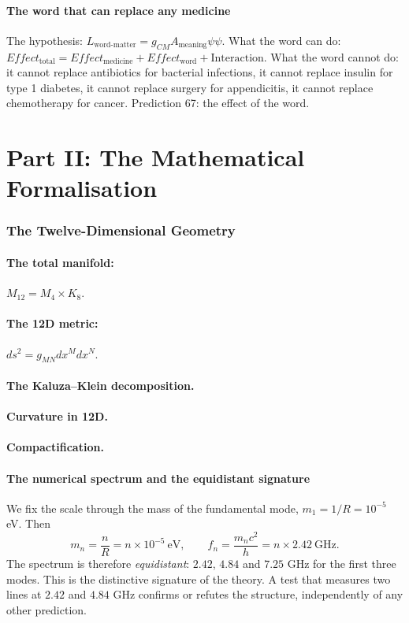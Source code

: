 \documentclass[11pt,a4paper]{article}
\begin{document}
\subsection{The word that can replace any medicine}
The hypothesis: $L_{\text{word-matter}} = g_{CM} A_{\text{meaning}} \psi \psi$. What the word can do: $Effect_{\text{total}} = Effect_{\text{medicine}} + Effect_{\text{word}} + \text{Interaction}$. What the word cannot do: it cannot replace antibiotics for bacterial infections, it cannot replace insulin for type 1 diabetes, it cannot replace surgery for appendicitis, it cannot replace chemotherapy for cancer. Prediction 67: the effect of the word.

\newpage
\part*{Part II: The Mathematical Formalisation}

\section{The Twelve-Dimensional Geometry}
\subsection{The total manifold:} $M_{12} = M_4 \times K_8$.
\subsection{The 12D metric:} $ds^2 = g_{MN} dx^M dx^N$.
\subsection{The Kaluza--Klein decomposition.}
\subsection{Curvature in 12D.}
\subsection{Compactification.}

\subsection{The numerical spectrum and the equidistant signature}
We fix the scale through the mass of the fundamental mode, $m_1 = 1/R = 10^{-5}$ eV. Then
\begin{equation}
m_n = \frac{n}{R} = n \times 10^{-5}\ \text{eV},
\qquad
f_n = \frac{m_n c^2}{h} = n \times 2.42\ \text{GHz}.
\end{equation}
The spectrum is therefore \emph{equidistant}: $2.42$, $4.84$ and $7.25$ GHz for the first three modes. This is the distinctive signature of the theory. A test that measures two lines at $2.42$ and $4.84$ GHz confirms or refutes the structure, independently of any other prediction.
\end{document}
